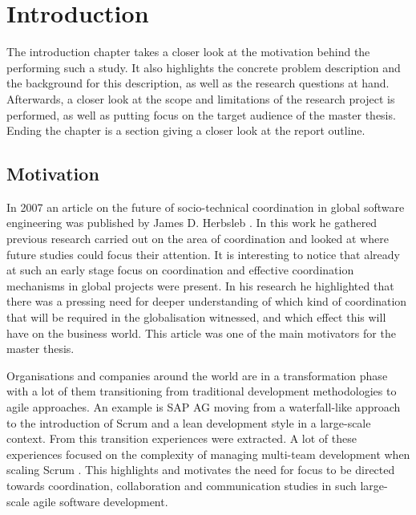 \chapter{Introduction}


\minitoc

The introduction chapter takes a closer look at the motivation behind the performing such a study. It also highlights the concrete problem description and the background for this description, as well as the research questions at hand. Afterwards, a closer look at the scope and limitations of the research project is performed, as well as putting focus on the target audience of the master thesis. Ending the chapter is a section giving a closer look at the report outline.

\newpage

\section{Motivation}

In 2007 an article on the future of socio-technical coordination in global software engineering was published by James D. Herbsleb \cite{Herbsleb2007}. In this work he gathered previous research carried out on the area of coordination and looked at where future studies could focus their attention. It is interesting to notice that already at such an early stage focus on coordination and effective coordination mechanisms in global projects were present. In his research he highlighted that there was a pressing need for deeper understanding of which kind of coordination that will be required in the globalisation witnessed, and which effect this will have on the business world. This article was one of the main motivators for the master thesis.

Organisations and companies around the world are in a transformation phase with a lot of them transitioning from traditional development methodologies to agile approaches. An example is SAP AG moving from a waterfall-like approach to the introduction of Scrum and a lean development style in a large-scale context. From this transition experiences were extracted. A lot of these experiences focused on the complexity of managing multi-team development when scaling Scrum \cite{Nord2011}. This highlights and motivates the need for focus to be directed towards coordination, collaboration and communication studies in such large-scale agile software development.

